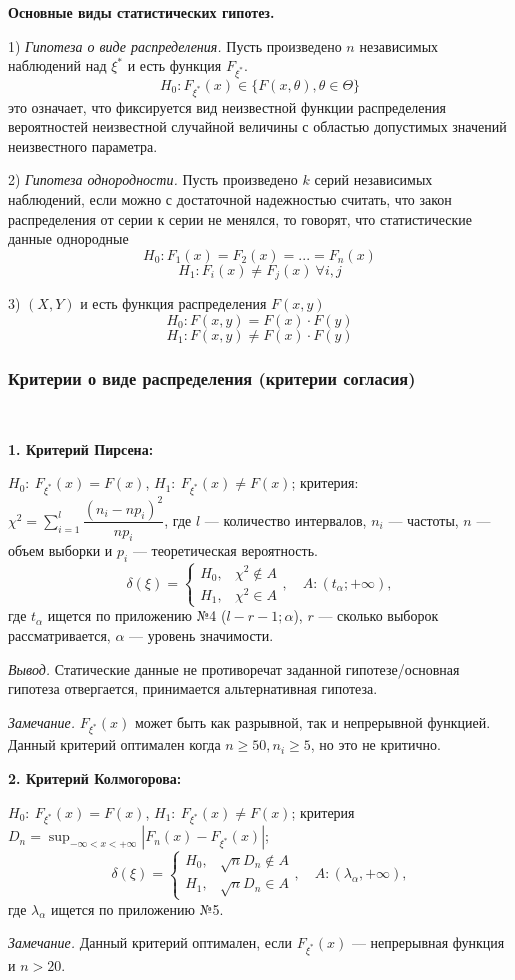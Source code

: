 \documentclass[9pt]{article}
\begin{document}
\par\textbf{Основные виды статистических гипотез.}
\par1) \textit{Гипотеза о виде распределения.} Пусть произведено \(n\) независимых наблюдений над \(\xi^*\) и есть функция \(F_{\xi^*}\).
\[H_0:F_{\xi^*}(x)\in\{F(x,\theta),\theta\in\Theta\}\]
это означает, что фиксируется вид неизвестной функции распределения вероятностей неизвестной случайной величины с областью допустимых значений неизвестного параметра.
\par2) \textit{Гипотеза однородности.} Пусть произведено \(k\) серий независимых наблюдений, если можно с достаточной надежностью считать, что закон распределения от серии к серии не менялся, то говорят, что статистические данные однородные
\[H_0:F_1(x)=F_2(x)=...=F_n(x)\]
\[H_1:F_i(x)\neq F_j(x)\ \forall i,j\]
\par3) \((X,Y)\) и есть функция распределения \(F(x,y)\)
\[H_0:F(x,y)=F(x)\cdot F(y)\]
\[H_1:F(x,y)\neq F(x)\cdot F(y)\]

\subsubsection{Критерии о виде распределения (критерии согласия)}

\ 
\par\textbf{1. Критерий Пирсена:}
\par\(H_0:\ F_{\xi^*}(x)=F(x)\), \(H_1:\ F_{\xi^*}(x)\neq F(x)\);  критерия: \(\chi^2=\displaystyle\sum_{i=1}^l\dfrac{(n_i-np_i)^2}{np_i}\), где \(l\) --- количество интервалов, \(n_i\) --- частоты, \(n\) --- объем выборки и \(p_i\) --- теоретическая вероятность.
\[\delta(\xi)=\left\{\begin{array}{ll}
    H_0, & \chi^2\notin A \\
    H_1, & \chi^2\in A
\end{array}\right.,\quad A:(t_\alpha;+\infty),\]
где \(t_\alpha\) ищется по приложению №4 (\(l-r-1;\alpha\)), \(r\) --- сколько выборок рассматривается, \(\alpha\) --- уровень значимости.
\par\textit{Вывод.} Статические данные не противоречат заданной гипотезе/основная гипотеза отвергается, принимается альтернативная гипотеза.
\par\textit{Замечание.} \(F_{\xi^*}(x)\) может быть как разрывной, так и непрерывной функцией. Данный критерий оптимален когда \(n\ge50,n_i\ge5\), но это не критично.
\par\textbf{2. Критерий Колмогорова:}
\par\(H_0:\ F_{\xi^*}(x)=F(x)\), \(H_1:\ F_{\xi^*}(x)\neq F(x)\);
\parСтатистика критерия \(D_n=\displaystyle\sup_{-\infty<x<+\infty}|F_n(x)-F_{\xi^*}(x)|\);
\[\delta(\xi)=\left\{\begin{array}{ll}
    H_0, & \sqrt{n}D_n\notin A \\
    H_1, & \sqrt{n}D_n\in A
\end{array}
\right.,\quad A:(\lambda_\alpha,+\infty),\]
где \(\lambda_\alpha\) ищется по приложению №5.
\par\textit{Замечание.} Данный критерий оптимален, если \(F_{\xi^*}(x)\) --- непрерывная функция и \(n>20\).
\end{document}

